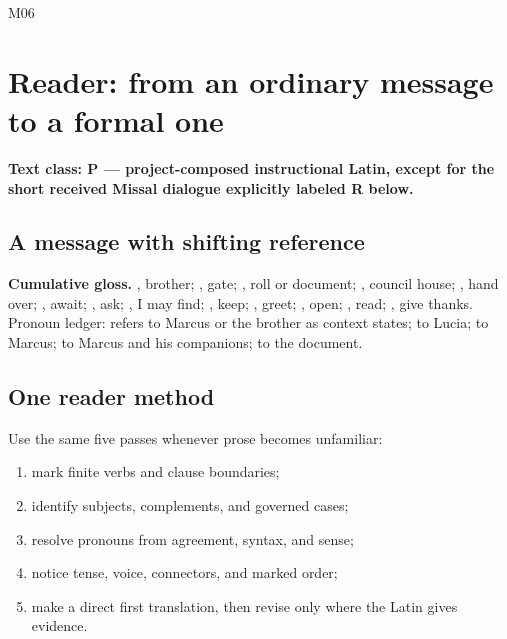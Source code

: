 \begin{courseunit}{M06}
\chapter{Reader: from an ordinary message to a formal one}

\textbf{Text class: P --- project-composed instructional Latin, except for the
short received Missal dialogue explicitly labeled R below.}

\section{A message with shifting reference}


\textbf{Cumulative gloss.} , brother; , gate;
, roll or document; , council house;
, hand over; , await; , ask;
, I may find; , keep; , greet;
, open; , read; , give thanks.
Pronoun ledger:  refers to Marcus or the brother as context
states;  to Lucia;  to Marcus;  to
Marcus and his companions;  to the document.

\section{One reader method}

Use the same five passes whenever prose becomes unfamiliar:

\begin{enumerate}
\item mark finite verbs and clause boundaries;
\item identify subjects, complements, and governed cases;
\item resolve pronouns from agreement, syntax, and sense;
\item notice tense, voice, connectors, and marked order;
\item make a direct first translation, then revise only where the Latin gives
evidence.
\end{enumerate}


\end{courseunit}
